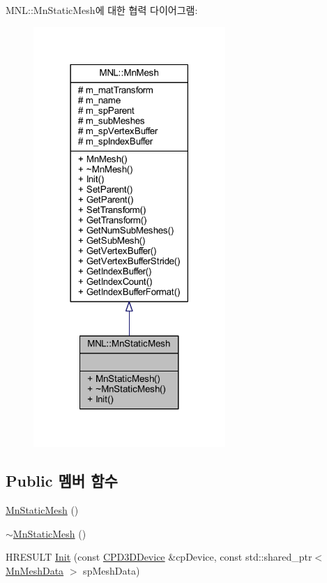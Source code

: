 M\+NL\+:\+:Mn\+Static\+Mesh에 대한 협력 다이어그램\+:\nopagebreak
\begin{figure}[H]
\begin{center}
\leavevmode
\includegraphics[width=206pt]{class_m_n_l_1_1_mn_static_mesh__coll__graph}
\end{center}
\end{figure}
\subsection*{Public 멤버 함수}
\begin{DoxyCompactItemize}
\item 
\hyperlink{class_m_n_l_1_1_mn_static_mesh_ac7c22c7bba4c6cd06a0cb391dd71b30f}{Mn\+Static\+Mesh} ()
\item 
\hyperlink{class_m_n_l_1_1_mn_static_mesh_aabf1053a7e31d518645d29c2de3b70dd}{$\sim$\+Mn\+Static\+Mesh} ()
\item 
H\+R\+E\+S\+U\+LT \hyperlink{class_m_n_l_1_1_mn_static_mesh_a0593293ce8d641b9573239828b8dc31b}{Init} (const \hyperlink{namespace_m_n_l_a1eec210db8f309a4a9ac0d9658784c31}{C\+P\+D3\+D\+Device} \&cp\+Device, const std\+::shared\+\_\+ptr$<$ \hyperlink{class_m_n_l_1_1_mn_mesh_data}{Mn\+Mesh\+Data} $>$ sp\+Mesh\+Data)
\end{DoxyCompactItemize}
